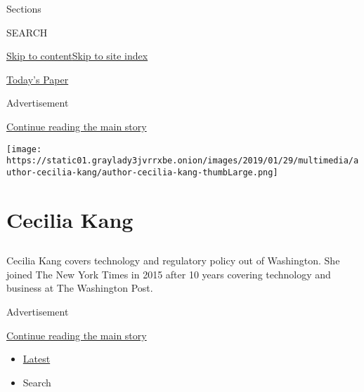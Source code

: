 Sections

SEARCH

\protect\hyperlink{site-content}{Skip to
content}\protect\hyperlink{site-index}{Skip to site index}

\href{https://myaccount.nytimes3xbfgragh.onion/auth/login?response_type=cookie\&client_id=vi}{}

\href{https://www.nytimes3xbfgragh.onion/section/todayspaper}{Today's
Paper}

Advertisement

\protect\hyperlink{after-top}{Continue reading the main story}

\texttt{[image: https://static01.graylady3jvrrxbe.onion/images/2019/01/29/multimedia/author-cecilia-kang/author-cecilia-kang-thumbLarge.png]}

\hypertarget{cecilia-kang}{%
\section{Cecilia Kang}\label{cecilia-kang}}

\subsection{}

Cecilia Kang covers technology and regulatory policy out of Washington.
She joined The New York Times in 2015 after 10 years covering technology
and business at The Washington Post.

Advertisement

\protect\hyperlink{after-mid1}{Continue reading the main story}

\begin{itemize}
\tightlist
\item
  \protect\hyperlink{stream-panel}{Latest}
\item
  Search
\end{itemize}


